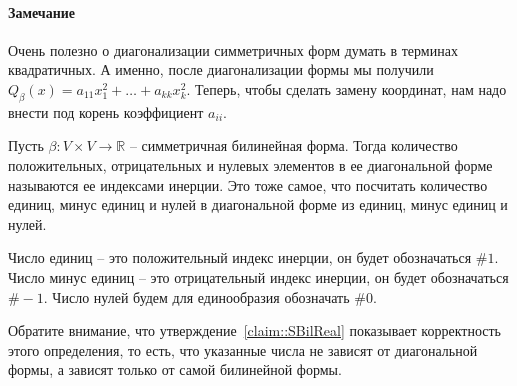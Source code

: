 \paragraph{Замечание}

Очень полезно о диагонализации симметричных форм думать в терминах квадратичных.
А именно, после диагонализации формы мы получили $Q_\beta(x) = a_{11}x_1^2 + \ldots +a_{kk}x_k^2$.
Теперь, чтобы сделать замену координат, нам надо внести под корень коэффициент $a_{ii}$.

\begin{definition}
Пусть $\beta\colon V\times V\to \mathbb R$ -- симметричная билинейная форма.
Тогда количество положительных, отрицательных и нулевых элементов в ее диагональной форме называются ее индексами инерции.
Это тоже самое, что посчитать количество единиц, минус единиц и нулей в диагональной форме из единиц, минус единиц и нулей.

Число единиц -- это положительный индекс инерции, он будет обозначаться $\#1$.
Число минус единиц -- это отрицательный индекс инерции, он будет обозначаться $\#-1$.
Число нулей будем для единообразия обозначать $\#0$.
\end{definition}

Обратите внимание, что утверждение~\ref{claim::SBilReal} показывает корректность этого определения, то есть, что указанные числа не зависят от диагональной формы, а зависят только от самой билинейной формы.
